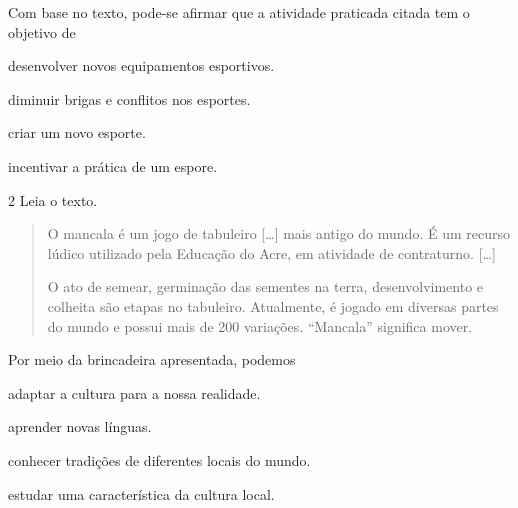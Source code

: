 \noindent{}Com base no texto, pode-se afirmar que a atividade praticada citada tem o objetivo de

\begin{escolha}
\item desenvolver novos equipamentos esportivos.

\item diminuir brigas e conflitos nos esportes.

\item criar um novo esporte.

\item incentivar a prática de um espore.
\end{escolha}


\num{2} Leia o texto.

\begin{quote}
O mancala é um jogo de tabuleiro {[}\ldots{}{]} mais antigo do mundo. É um
recurso lúdico utilizado pela Educação do Acre, em atividade
de contraturno. {[}\ldots{}{]}

O ato de semear, germinação das sementes na terra, desenvolvimento e
colheita são etapas no tabuleiro. Atualmente, é jogado em diversas
partes do mundo e possui mais de 200 variações. “Mancala” significa
mover.

\end{quote}

\noindent{}Por meio da brincadeira apresentada, podemos

\begin{escolha}
\item adaptar a cultura para a nossa realidade.

\item aprender novas línguas.

\item conhecer tradições de diferentes locais do mundo.

\item estudar uma característica da cultura local.
\end{escolha}

